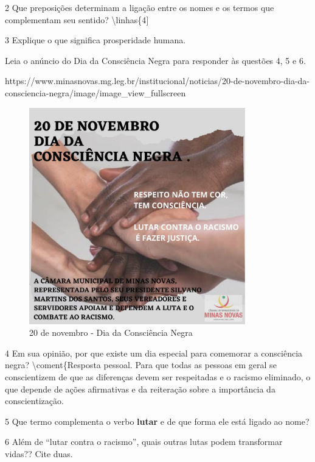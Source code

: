 {\begin{itemize}
\begin{itemize}
\num{2} Que preposições determinam a ligação entre os nomes e os termos
que complementam seu sentido? \textbackslash{}linhas\{4{]}

\num{3} Explique o que significa prosperidade humana. 

Leia o anúncio do Dia da Consciência Negra para responder às questões 4,
5 e 6.

https://www.minasnovas.mg.leg.br/institucional/noticias/20-de-novembro-dia-da-consciencia-negra/image/image\_view\_fullscreen

\begin{figure}
\centering
\includegraphics[width=3.69792in,height=3.69792in]{./_SAEB_9_POR/media/image32.jpeg}
\caption{20 de novembro - Dia da Consciência Negra}
\end{figure}

\num{4} Em sua opinião, por que existe um dia especial para comemorar a
consciência negra?  \textbackslash{}coment\{Resposta pessoal.
Para que todas as pessoas em geral se conscientizem de que as diferenças
devem ser respeitadas e o racismo eliminado, o que depende de ações
afirmativas e da reiteração sobre a importância da conscientização.

\num{5} Que termo complementa o verbo \textbf{lutar} e de que forma ele
está ligado ao nome? 

\num{6} Além de ``lutar contra o racismo'', quais outras lutas podem
transformar vidas?? Cite duas. 


\end{itemize}
\end{itemize}}
